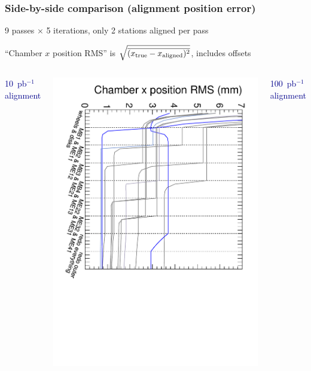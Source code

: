 \documentclass[compress]{beamer}
\begin{document}
\begin{frame}
\frametitle{Side-by-side comparison (alignment position error)}

9 passes $\times$ 5 iterations, only 2 stations aligned per pass

\vspace{0.2 cm}
``Chamber $x$ position RMS'' is $\sqrt{\overline{(x_{\mbox{\scriptsize true}} - x_{\mbox{\scriptsize aligned}})^2}}$, includes offsets

\vspace{-0.2 cm}
\begin{columns}
\begin{center} \textcolor{darkblue}{10~pb$^{-1}$ alignment} \end{center}

\vspace{-0.25 cm}
\includegraphics[height=\linewidth, angle=90]{convergence-10.pdf}

\begin{center} \textcolor{darkblue}{100~pb$^{-1}$ alignment} \end{center}


\end{columns}
\end{frame}
\end{document}

